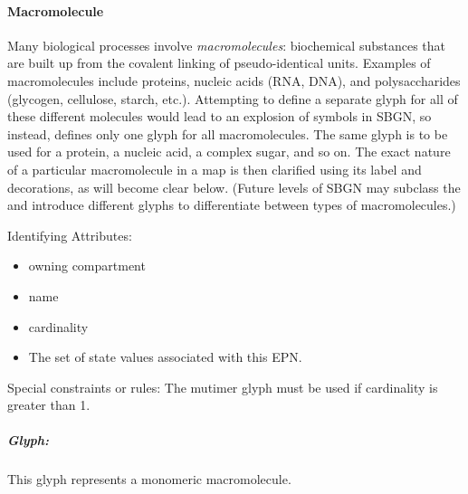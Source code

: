 
\paragraph{Macromolecule}
\label{sec:macromolecule}

Many biological processes involve \emph{macromolecules}: biochemical substances that are built up from the covalent linking of pseudo-identical units.  Examples of macromolecules include proteins, nucleic acids (RNA, DNA), and polysaccharides (glycogen, cellulose, starch, etc.).  Attempting to define a separate glyph for all of these different molecules would lead to an explosion of symbols in SBGN, so instead, \SBGNPDLone defines only one glyph for all macromolecules.  The same glyph is to be used for a protein, a nucleic acid, a complex sugar, and so on.  The exact nature of a particular macromolecule in a map is then clarified using its label and decorations, as will become clear below.  (Future levels of SBGN may subclass the  and introduce different glyphs to differentiate between types of macromolecules.)

\begin{glyphDescription}
\item[Identifying Attributes:]\mbox{}
  \begin{itemize}
  \item owning compartment
  \item name
  \item cardinality
  \item The set of state values associated with this EPN.
 \end{itemize}
\item[Special constraints or rules:]\mbox{}\newline The mutimer glyph
  must be used if cardinality is greater than 1.
\end{glyphDescription}

\subparagraph{Glyph: }

This glyph represents a monomeric macromolecule.


